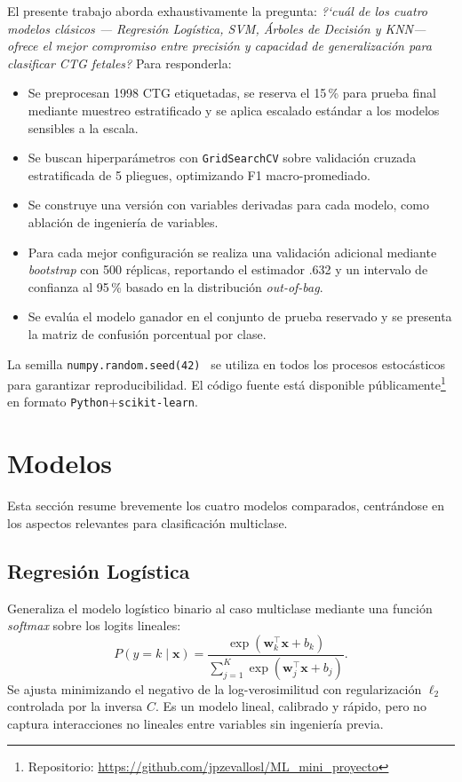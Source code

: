 \documentclass[conference]{IEEEtran}
\begin{document}
El presente trabajo aborda exhaustivamente la pregunta: \emph{?`cu\'al de los cuatro modelos cl\'asicos --- Regresi\'on Log\'istica, SVM, \'Arboles de Decisi\'on y KNN--- ofrece el mejor compromiso entre precisi\'on y capacidad de generalizaci\'on para clasificar CTG fetales?} Para responderla:
\begin{itemize}
    \item Se preprocesan 1998 CTG etiquetadas, se reserva el 15\,\% para prueba final mediante muestreo estratificado y se aplica escalado est\'andar a los modelos sensibles a la escala.
    \item Se buscan hiperpar\'ametros con \texttt{GridSearchCV} sobre validaci\'on cruzada estratificada de 5 pliegues, optimizando F1 macro-promediado.
    \item Se construye una versi\'on con variables derivadas para cada modelo, como ablaci\'on de ingenier\'ia de variables.
    \item Para cada mejor configuraci\'on se realiza una validaci\'on adicional mediante \emph{bootstrap} con 500 r\'eplicas, reportando el estimador .632 y un intervalo de confianza al 95\,\% basado en la distribuci\'on \emph{out-of-bag}.
    \item Se eval\'ua el modelo ganador en el conjunto de prueba reservado y se presenta la matriz de confusi\'on porcentual por clase.
\end{itemize}
La semilla \texttt{numpy.random.seed(42)}~\cite{numpy_seed} se utiliza en todos los procesos estoc\'asticos para garantizar reproducibilidad. El c\'odigo fuente est\'a disponible p\'ublicamente\footnote{Repositorio: \url{https://github.com/jpzevallosl/ML_mini_proyecto}} en formato \texttt{Python}+\texttt{scikit-learn}.

\section{Modelos}
Esta secci\'on resume brevemente los cuatro modelos comparados, centr\'andose en los aspectos relevantes para clasificaci\'on multiclase.

\subsection{Regresi\'on Log\'istica}
Generaliza el modelo log\'istico binario al caso multiclase mediante una funci\'on \emph{softmax} sobre los logits lineales:
\begin{equation}
P(y = k \mid \mathbf{x}) = \frac{\exp(\mathbf{w}_k^\top \mathbf{x} + b_k)}{\sum_{j=1}^{K}\exp(\mathbf{w}_j^\top \mathbf{x} + b_j)}.
\end{equation}
Se ajusta minimizando el negativo de la log-verosimilitud con regularizaci\'on $\ell_2$ controlada por la inversa $C$. Es un modelo lineal, calibrado y r\'apido, pero no captura interacciones no lineales entre variables sin ingenier\'ia previa.
\end{document}
